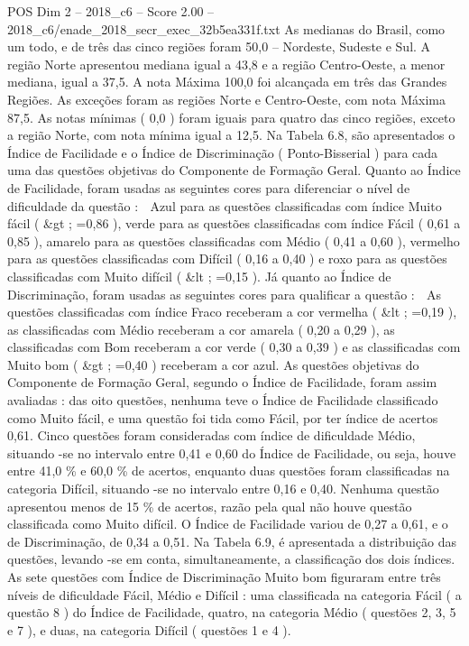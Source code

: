 \begin{textsample}{POS Dim 2 – 2018\_c6 – Score 2.00 – 2018\_c6/enade\_2018\_secr\_exec\_32b5ea331f.txt}
As medianas do Brasil, como um todo, e de três das cinco regiões foram 50,0 – Nordeste, Sudeste e Sul.
A região Norte apresentou mediana igual a 43,8 e a região Centro-Oeste, a menor mediana, igual a 37,5.
A nota Máxima 100,0 foi alcançada em três das Grandes Regiões.
As exceções foram as regiões Norte e Centro-Oeste, com nota Máxima 87,5.
As notas mínimas ( 0,0 ) foram iguais para quatro das cinco regiões, exceto a região Norte, com nota mínima igual a 12,5.
Na Tabela 6.8, são apresentados o Índice de Facilidade e o Índice de Discriminação ( Ponto-Bisserial ) para cada uma das questões objetivas do Componente de Formação Geral.
Quanto ao Índice de Facilidade, foram usadas as seguintes cores para diferenciar o nível de dificuldade da questão :  Azul para as questões classificadas com índice Muito fácil ( \&gt ; =0,86 ), verde para as questões classificadas com índice Fácil ( 0,61 a 0,85 ), amarelo para as questões classificadas com Médio ( 0,41 a 0,60 ), vermelho para as questões classificadas com Difícil ( 0,16 a 0,40 ) e roxo para as questões classificadas com Muito difícil ( \&lt ; =0,15 ).
Já quanto ao Índice de Discriminação, foram usadas as seguintes cores para qualificar a questão :  As questões classificadas com índice Fraco receberam a cor vermelha ( \&lt ; =0,19 ), as classificadas com Médio receberam a cor amarela ( 0,20 a 0,29 ), as classificadas com Bom receberam a cor verde ( 0,30 a 0,39 ) e as classificadas com Muito bom ( \&gt ; =0,40 ) receberam a cor azul.
As questões objetivas do Componente de Formação Geral, segundo o Índice de Facilidade, foram assim avaliadas : das oito questões, nenhuma teve o Índice de Facilidade classificado como Muito fácil, e uma questão foi tida como Fácil, por ter índice de acertos 0,61.
Cinco questões foram consideradas com índice de dificuldade Médio, situando -se no intervalo entre 0,41 e 0,60 do Índice de Facilidade, ou seja, houve entre 41,0 \% e 60,0 \% de acertos, enquanto duas questões foram classificadas na categoria Difícil, situando -se no intervalo entre 0,16 e 0,40.
Nenhuma questão apresentou menos de 15 \% de acertos, razão pela qual não houve questão classificada como Muito difícil.
O Índice de Facilidade variou de 0,27 a 0,61, e o de Discriminação, de 0,34 a 0,51.
Na Tabela 6.9, é apresentada a distribuição das questões, levando -se em conta, simultaneamente, a classificação dos dois índices.
As sete questões com Índice de Discriminação Muito bom figuraram entre três níveis de dificuldade Fácil, Médio e Difícil : uma classificada na categoria Fácil ( a questão 8 ) do Índice de Facilidade, quatro, na categoria Médio ( questões 2, 3, 5 e 7 ), e duas, na categoria Difícil ( questões 1 e 4 ).

\end{textsample}
